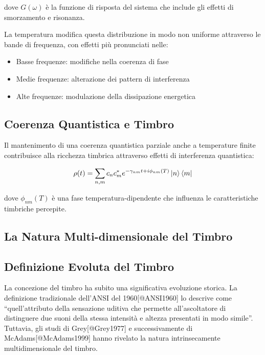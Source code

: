 \documentclass{gs-adonis}
\providecommand{\tightlist}{%
  \setlength{\itemsep}{0pt}\setlength{\parskip}{0pt}}
\begin{document}
dove \(G(\omega)\) è la funzione di risposta del sistema che include gli
effetti di smorzamento e risonanza.

La temperatura modifica questa distribuzione in modo non uniforme
attraverso le bande di frequenza, con effetti più pronunciati nelle:

\begin{itemize}
\tightlist
\item
  Basse frequenze: modifiche nella coerenza di fase
\item
  Medie frequenze: alterazione dei pattern di interferenza
\item
  Alte frequenze: modulazione della dissipazione energetica
\end{itemize}

\subsection{Coerenza Quantistica e
Timbro}\label{coerenza-quantistica-e-timbro}

Il mantenimento di una coerenza quantistica parziale anche a temperature
finite contribuisce alla ricchezza timbrica attraverso effetti di
interferenza quantistica:

\[\rho(t) = \sum_{n,m} c_n c_m^* e^{-\gamma_{nm}t + i\phi_{nm}(T)} \ket{n}\bra{m}\]

dove \(\phi_{nm}(T)\) è una fase temperatura-dipendente che influenza le
caratteristiche timbriche percepite.

\subsection{La Natura Multi-dimensionale del
Timbro}\label{la-natura-multi-dimensionale-del-timbro-1}

\subsection{Definizione Evoluta del
Timbro}\label{definizione-evoluta-del-timbro}

La concezione del timbro ha subito una significativa evoluzione storica.
La definizione tradizionale dell'ANSI del 1960{[}@ANSI1960{]} lo
descrive come ``quell'attributo della sensazione uditiva che permette
all'ascoltatore di distinguere due suoni della stessa intensità e
altezza presentati in modo simile''. Tuttavia, gli studi di
Grey{[}@Grey1977{]} e successivamente di McAdams{[}@McAdams1999{]} hanno
rivelato la natura intrinsecamente multidimensionale del timbro.
\end{document}
